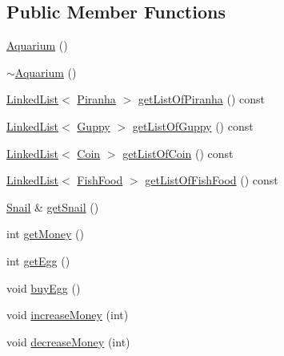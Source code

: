 \subsection*{Public Member Functions}
\begin{DoxyCompactItemize}
\item 
\mbox{\hyperlink{class_aquarium_a0176cc59bd34e39fd3d79d56d4db4d08}{Aquarium}} ()
\item 
\mbox{\hyperlink{class_aquarium_a40f31f27104d48e4f558d40059f4a590}{$\sim$\+Aquarium}} ()
\item 
\mbox{\hyperlink{class_linked_list}{Linked\+List}}$<$ \mbox{\hyperlink{class_piranha}{Piranha}} $>$ \mbox{\hyperlink{class_aquarium_a3fb338105afbdb86806f721a2bf15dda}{get\+List\+Of\+Piranha}} () const
\item 
\mbox{\hyperlink{class_linked_list}{Linked\+List}}$<$ \mbox{\hyperlink{class_guppy}{Guppy}} $>$ \mbox{\hyperlink{class_aquarium_a745e4d67436255cc4dbb4285d6413eb3}{get\+List\+Of\+Guppy}} () const
\item 
\mbox{\hyperlink{class_linked_list}{Linked\+List}}$<$ \mbox{\hyperlink{class_coin}{Coin}} $>$ \mbox{\hyperlink{class_aquarium_a5d8a7dd4849b12c9fdc3a8a43ab4d4a0}{get\+List\+Of\+Coin}} () const
\item 
\mbox{\hyperlink{class_linked_list}{Linked\+List}}$<$ \mbox{\hyperlink{class_fish_food}{Fish\+Food}} $>$ \mbox{\hyperlink{class_aquarium_a499b9583503fde6e0dbc16a4c73bc706}{get\+List\+Of\+Fish\+Food}} () const
\item 
\mbox{\hyperlink{class_snail}{Snail}} \& \mbox{\hyperlink{class_aquarium_aeba34bc057163d89f62f7ed06fad4075}{get\+Snail}} ()
\item 
int \mbox{\hyperlink{class_aquarium_a7622156e901ca61c60b32ed8f6f5ace9}{get\+Money}} ()
\item 
int \mbox{\hyperlink{class_aquarium_af74c3502752a20b2d2b8832342b243b7}{get\+Egg}} ()
\item 
void \mbox{\hyperlink{class_aquarium_a5e26a35a516d1e6db1e3c4b7f367e498}{buy\+Egg}} ()
\item 
void \mbox{\hyperlink{class_aquarium_a5274f810d3322c4992aae11dbe8d7e87}{increase\+Money}} (int)
\item 
void \mbox{\hyperlink{class_aquarium_a6af7636a999b3d42f2d313d59e9cf88e}{decrease\+Money}} (int)
\end{DoxyCompactItemize}
